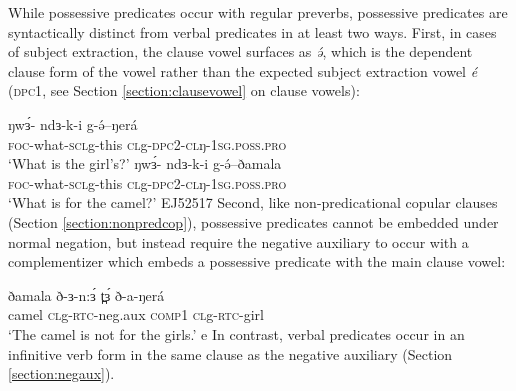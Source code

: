 While possessive predicates occur with regular preverbs, possessive predicates are syntactically distinct from verbal predicates in at least two ways. First, in cases of subject extraction, the clause vowel surfaces as \textit{ə́}, which is the dependent clause form of the vowel rather than the expected subject extraction vowel \textit{é} (\textsc{dpc1}, see Section \ref{section:clausevowel} on clause vowels):

\ea
\ea \gll  	ŋwɜ́- ndɜ-k-i 	g-ə́--ŋerá\\
			\textsc{foc}-what-\textsc{scl}g-this \textsc{cl}g-\textsc{dpc2}-\textsc{cl}ŋ-\textsc{1sg.poss.pro}\\
	\glt 	`What is the girl's?'
\ex \gll  	ŋwɜ́- ndɜ-k-i 	g-ə́--ðamala \\
			\textsc{foc}-what-\textsc{scl}g-this \textsc{cl}g-\textsc{dpc2}-\textsc{cl}ŋ-\textsc{1sg.poss.pro}\\
	\glt 	`What is for the camel?'   \hfill EJ52517
	\z 
\z 
Second, like non-predicational copular clauses (Section \ref{section:nonpredcop}), possessive predicates cannot be embedded under normal negation, but instead require the negative auxiliary to occur with a complementizer which embeds a possessive predicate with the main clause vowel:

\ea 
\gll  ðamala ð-ɜ-n:ɜ́  t̪ɜ́	ð-a-ŋerá\\
      camel  \textsc{cl}g-\textsc{rtc}-neg.aux \textsc{comp1} \textsc{cl}g-\textsc{rtc}-girl\\
\glt `The camel is not for the girls.' e%
\z 
In contrast, verbal predicates occur in an infinitive verb form in the same clause as the negative auxiliary (Section \ref{section:negaux}). 



%


	
%
	
	
%
%




